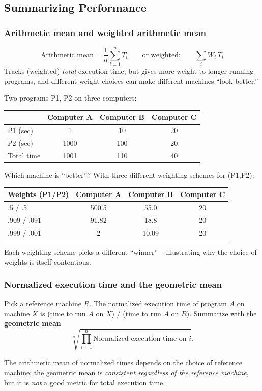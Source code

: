 \subsection{Summarizing Performance}

\subsubsection{Arithmetic mean and weighted arithmetic mean}
\[
  \text{Arithmetic mean} = \frac{1}{n}\sum_{i=1}^n T_i \qquad\text{or
  weighted:}\qquad \sum_i W_i \, T_i
\]
Tracks (weighted) \emph{total} execution time, but gives more weight to
longer-running programs, and different weight choices can make different
machines ``look better.''

\begin{eg}
Two programs P1, P2 on three computers:
\begin{center}
\begin{tabular}{@{}lccc@{}}
\toprule
 & Computer A & Computer B & Computer C \\
\midrule
P1 (sec)   & 1    & 10  & 20 \\
P2 (sec)   & 1000 & 100 & 20 \\
Total time & 1001 & 110 & 40 \\
\bottomrule
\end{tabular}
\end{center}
Which machine is ``better''? With three different weighting schemes for
(P1,P2):
\begin{center}
\begin{tabular}{@{}lccc@{}}
\toprule
Weights (P1/P2) & Computer A & Computer B & Computer C \\
\midrule
.5 / .5     & 500.5 & 55.0  & 20 \\
.909 / .091 & 91.82 & 18.8  & 20 \\
.999 / .001 & 2     & 10.09 & 20 \\
\bottomrule
\end{tabular}
\end{center}
Each weighting scheme picks a different ``winner'' -- illustrating why the
choice of weights is itself contentious.
\end{eg}

\subsubsection{Normalized execution time and the geometric mean}
\begin{definition}
Pick a reference machine $R$. The normalized execution time of program $A$
on machine $X$ is (time to run $A$ on $X$) / (time to run $A$ on $R$).
Summarize with the \textbf{geometric mean}
\[
  \sqrt[n]{\prod_{i=1}^{n} \text{Normalized execution time on } i}.
\]
\end{definition}
\begin{remark}
The arithmetic mean of normalized times depends on the choice of reference
machine; the geometric mean is \emph{consistent regardless of the reference
machine}, but it is \emph{not} a good metric for total execution time.
\end{remark}

